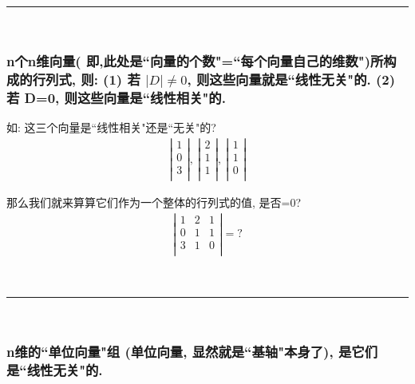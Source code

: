 \documentclass[UTF8]{ctexart}
\begin{document}
~\\
\hrule
~\\

\subsubsection{n个n维向量( 即,此处是``向量的个数"=``每个向量自己的维数")所构成的行列式, 则: (1) 若  $|D| \ne 0$, 则这些向量就是``线性无关"的. (2) 若 D=0, 则这些向量是``线性相关"的.}




\begin{myEnvSample}
	如: 这三个向量是``线性相关"还是``无关"的? 
	\begin{align*}
		\left| \begin{array}{l}
			1\\
			0\\
			3\\
		\end{array} \right|,\ \left| \begin{array}{l}
			2\\
			1\\
			1\\
		\end{array} \right|,\ \left| \begin{array}{l}
			1\\
			1\\
			0\\
		\end{array} \right|
	\end{align*}
	
	那么我们就来算算它们作为一个整体的行列式的值, 是否=0?
	\begin{align*}
		\left| \begin{matrix}
			1&		2&		1\\
			0&		1&		1\\
			3&		1&		0\\
		\end{matrix} \right| = ?
	\end{align*}
\end{myEnvSample}


~\\
\hrule
~\\

\subsubsection{n维的``单位向量"组 (单位向量, 显然就是``基轴"本身了), 是它们是``线性无关"的. }
\end{document}
